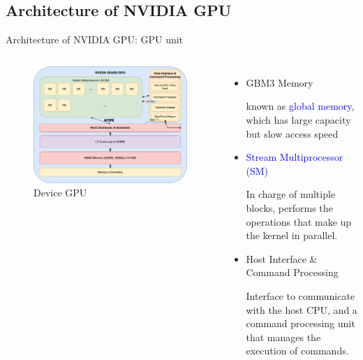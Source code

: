 \documentclass[dvipdfmx, 11pt, aspectratio=169]{beamer}   %
\begin{document}
\subsection{Architecture of NVIDIA GPU}
\begin{frame}{Architecture of NVIDIA GPU: GPU unit}
\vspace{-\baselineskip}
\begin{columns}
  \begin{figure}
    \includegraphics[scale=0.07]{img/gpuUnit.png}
    \caption{Device GPU}
  \end{figure}
  {\footnotesize
  \begin{itemize}
    \item GBM3 Memory
    
    known as \textcolor{blue}{global memory}, which has large capacity but slow access speed
    \item \textcolor{blue}{Stream Multiprocessor (SM)}
    
    In charge of multiple blocks, performs the operations that make up the kernel in parallel.
    \item Host Interface \& Command Processing

    Interface to communicate with the host CPU, and a command processing unit that manages the execution of commands.
  \end{itemize}
  }
\end{columns}
\end{frame}
\end{document}
